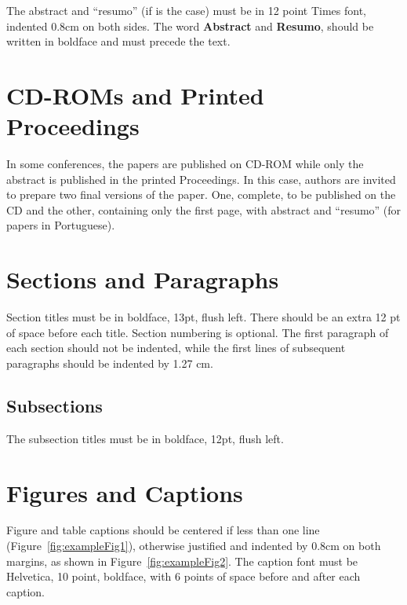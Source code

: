 \documentclass[12pt]{article}
\begin{document}
The abstract and ``resumo'' (if is the case) must be in 12 point Times font,
indented 0.8cm on both sides. The word \textbf{Abstract} and \textbf{Resumo},
should be written in boldface and must precede the text.

\section{CD-ROMs and Printed Proceedings}

In some conferences, the papers are published on CD-ROM while only the
abstract is published in the printed Proceedings. In this case, authors are
invited to prepare two final versions of the paper. One, complete, to be
published on the CD and the other, containing only the first page, with
abstract and ``resumo'' (for papers in Portuguese).

\section{Sections and Paragraphs}

Section titles must be in boldface, 13pt, flush left. There should be an extra
12 pt of space before each title. Section numbering is optional. The first
paragraph of each section should not be indented, while the first lines of
subsequent paragraphs should be indented by 1.27 cm.

\subsection{Subsections}

The subsection titles must be in boldface, 12pt, flush left.

\section{Figures and Captions}\label{sec:figs}


Figure and table captions should be centered if less than one line
(Figure~\ref{fig:exampleFig1}), otherwise justified and indented by 0.8cm on
both margins, as shown in Figure~\ref{fig:exampleFig2}. The caption font must
be Helvetica, 10 point, boldface, with 6 points of space before and after each
caption.
\end{document}
